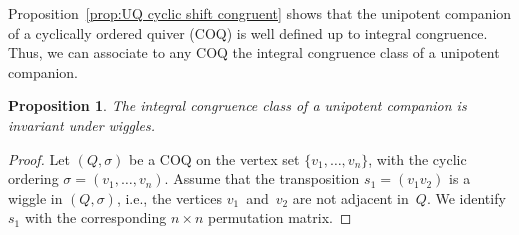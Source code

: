 \documentclass[11pt, letterpaper]{amsart}
\newtheorem{proposition}[theorem]{Proposition}
\theoremstyle{definition}
\numberwithin{equation}{section}
\begin{document}
Proposition~\ref{prop:UQ cyclic shift congruent} shows that 
the unipotent companion of a cyclically ordered quiver (COQ) is well defined up to integral congruence.
Thus, we can associate to any COQ the integral congruence class of a unipotent companion. 

\begin{proposition} 
\label{prop:UQ wiggle congruent}
The integral congruence class of a unipotent companion is invariant under wiggles.  
 \end{proposition}

\begin{proof}
Let $(Q,\sigma)$ be a COQ on the vertex set $\{v_1,\dots,v_n\}$,
with the cyclic ordering $\sigma=(v_1,\dots,v_n)$. 
Assume that the transposition $s_1=(v_1 v_2)$ is a wiggle in $(Q,\sigma)$, 
i.e., the vertices $v_1$~and~$v_2$ are not adjacent in~$Q$.
We identify $s_1$ with the corresponding $n\times n$ permutation matrix. 


\end{proof}
\end{document}
